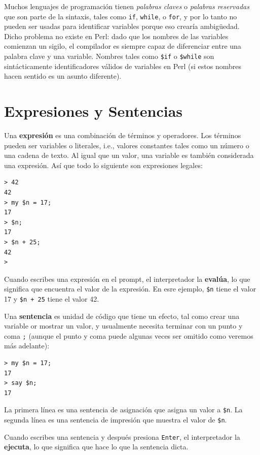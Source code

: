 Muchos lenguajes de programación tienen \emph{palabras claves} o
\emph{palabras reservadas} que son parte de la sintaxis, tales como
{\tt if}, {\tt while}, o {\tt for}, y por lo tanto no pueden ser usadas
para identificar variables porque eso crearía ambigüedad. Dicho problema
no existe en Perl: dado que los nombres de las variables comienzan un sigilo,
el compilador es siempre capaz de diferenciar entre una palabra clave
y una variable. Nombres tales como {\tt \$if} o {\tt \$while} son
sintácticamente identificadores válidos de variables en Perl 
(si estos nombres hacen sentido es un asunto diferente).


\section{Expresiones y Sentencias}
\label{expr_and_statements}

Una {\bf expresión} es una combinación de términos y operadores.
Los términos pueden ser variables o literales, i.e., valores constantes tales
como un número o una cadena de texto. Al igual que un valor, una variable
es también considerada una expresión. Así que todo lo siguiente
son expresiones legales:

\begin{verbatim}
> 42
42
> my $n = 17;
17
> $n;
17
> $n + 25;
42
>
\end{verbatim}
%
Cuando escribes una expresión en el prompt, el interpretador
la {\bf evalúa}, lo que significa que encuentra el valor de la expresión.
En esre ejemplo, {\tt \$n} tiene el valor 17 y {\tt \$n + 25} tiene
el valor 42.

Una {\bf sentencia} es unidad de código que tiene un efecto, 
tal como crear una variable or mostrar un valor, y usualmente
necesita terminar con un punto y coma {\tt ;} (aunque el punto y coma
puede algunas veces ser omitido como veremos más adelante):

\begin{verbatim}
> my $n = 17;
17
> say $n;
17
\end{verbatim}
%

La primera línea es una sentencia de asignación que asigna un 
valor a {\tt \$n}. La segunda línea es una sentencia de impresión 
que muestra el valor de {\tt \$n}.

Cuando escribes una sentencia y después presiona {\tt Enter},
el interpretador la {\bf ejecuta}, lo que significa que hace 
lo que la sentencia dicta.

